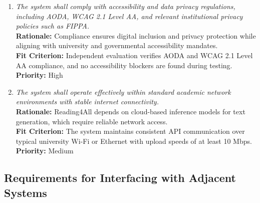 \documentclass[12pt]{article}
\begin{document}
\begin{enumerate}[label=OER-WE\arabic*., wide=0pt, leftmargin=*]
  \item \emph{The system shall comply with accessibility and data privacy regulations, including AODA, WCAG 2.1 Level AA, and relevant institutional privacy policies such as FIPPA.}\\[2mm]
    {\bf Rationale:} Compliance ensures digital inclusion and privacy protection while aligning with university and governmental accessibility mandates.\\
    {\bf Fit Criterion:} Independent evaluation verifies AODA and WCAG 2.1 Level AA compliance, and no accessibility blockers are found during testing.\\
    {\bf Priority:} High

  \item \emph{The system shall operate effectively within standard academic network environments with stable internet connectivity.}\\[2mm]
    {\bf Rationale:} Reading4All depends on cloud-based inference models for text generation, which require reliable network access.\\
    {\bf Fit Criterion:} The system maintains consistent API communication over typical university Wi-Fi or Ethernet with upload speeds of at least 10 Mbps.\\
    {\bf Priority:} Medium
\end{enumerate}

\subsection{Requirements for Interfacing with Adjacent Systems}
\end{document}
